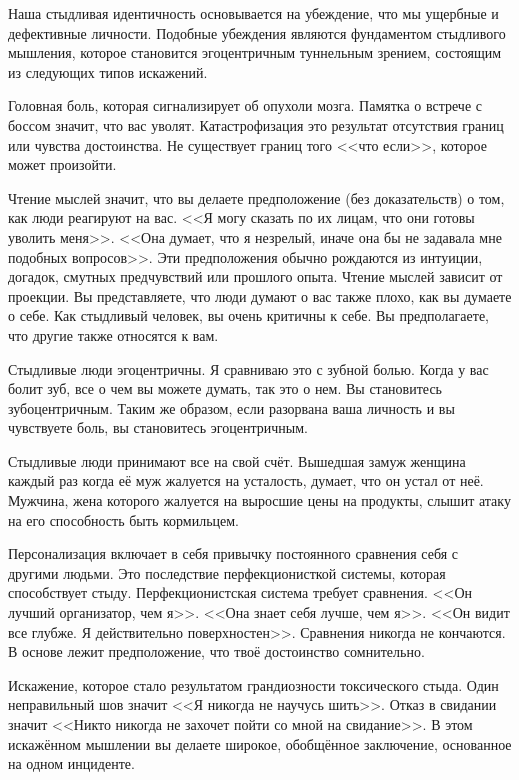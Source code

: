 \documentclass[10pt, fleqn]{article}
\begin{document}
Наша стыдливая идентичность основывается на убеждение, что мы ущербные и дефективные личности. Подобные убеждения являются фундаментом стыдливого мышления, которое становится эгоцентричным туннельным зрением, состоящим из следующих типов искажений.




Головная боль, которая сигнализирует об опухоли мозга. Памятка о встрече с боссом значит, что вас уволят. Катастрофизация это результат отсутствия границ или чувства достоинства. Не существует границ того <<что если>>, которое может произойти.



Чтение мыслей значит, что вы делаете предположение (без доказательств) о том, как люди реагируют на вас. <<Я могу сказать по их лицам, что они готовы уволить меня>>. <<Она думает, что я незрелый, иначе она бы не задавала мне подобных вопросов>>. Эти предположения обычно рождаются из интуиции, догадок, смутных предчувствий или прошлого опыта. Чтение мыслей зависит от проекции. Вы представляете, что люди думают о вас также плохо, как вы думаете о себе. Как стыдливый человек, вы очень критичны к себе. Вы предполагаете, что другие также относятся к вам.


Стыдливые люди эгоцентричны. Я сравниваю это с зубной болью. Когда у вас болит зуб, все о чем вы можете думать, так это о нем. Вы становитесь зубоцентричным. Таким же образом, если разорвана ваша личность и вы чувствуете боль, вы становитесь эгоцентричным.

Стыдливые люди принимают все на свой счёт. Вышедшая замуж женщина каждый раз когда её муж жалуется на усталость, думает, что он устал от неё. Мужчина, жена которого жалуется на выросшие цены на продукты, слышит атаку на его способность быть кормильцем.

Персонализация включает в себя привычку постоянного сравнения себя с другими людьми. Это последствие перфекционисткой системы, которая способствует стыду. Перфекционистская система требует сравнения. <<Он лучший организатор, чем я>>. <<Она знает себя лучше, чем я>>. <<Он видит все глубже. Я действительно поверхностен>>. Сравнения никогда не кончаются. В основе лежит предположение, что твоё достоинство сомнительно.



Искажение, которое стало результатом грандиозности токсического стыда. Один неправильный шов значит <<Я никогда не научусь шить>>. Отказ в свидании значит <<Никто никогда не захочет пойти со мной на свидание>>. В этом искажённом мышлении вы делаете широкое, обобщённое заключение, основанное на одном инциденте.
\end{document}
